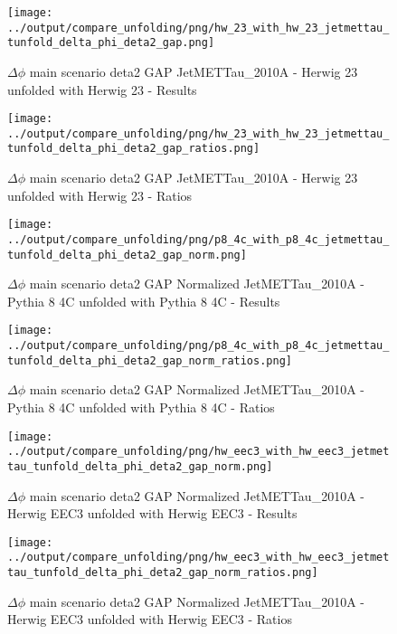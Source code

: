 \documentclass[11pt]{book}
\begin{document}
\begin{figure}[ht]
\centering
\texttt{[image: ../output/compare\_unfolding/png/hw\_23\_with\_hw\_23\_jetmettau\_tunfold\_delta\_phi\_deta2\_gap.png]}
\caption{$\Delta\phi$ main scenario deta2 GAP JetMETTau\_2010A - Herwig 23 unfolded with Herwig 23 - Results}
\label{hw_23_hw_23_jetmettau_tunfold_delta_phi_deta2_gap_a}
\end{figure}

\begin{figure}[ht]
\centering
\texttt{[image: ../output/compare\_unfolding/png/hw\_23\_with\_hw\_23\_jetmettau\_tunfold\_delta\_phi\_deta2\_gap\_ratios.png]}
\caption{$\Delta\phi$ main scenario deta2 GAP JetMETTau\_2010A - Herwig 23 unfolded with Herwig 23 - Ratios}
\label{hw_23_hw_23_jetmettau_tunfold_delta_phi_deta2_gap_b}
\end{figure}

\begin{figure}[ht]
\centering
\texttt{[image: ../output/compare\_unfolding/png/p8\_4c\_with\_p8\_4c\_jetmettau\_tunfold\_delta\_phi\_deta2\_gap\_norm.png]}
\caption{$\Delta\phi$ main scenario deta2 GAP Normalized JetMETTau\_2010A - Pythia 8 4C unfolded with Pythia 8 4C - Results}
\label{p8_p8_jetmettau_tunfold_delta_phi_deta2_gap_norm_a}
\end{figure}

\begin{figure}[ht]
\centering
\texttt{[image: ../output/compare\_unfolding/png/p8\_4c\_with\_p8\_4c\_jetmettau\_tunfold\_delta\_phi\_deta2\_gap\_norm\_ratios.png]}
\caption{$\Delta\phi$ main scenario deta2 GAP Normalized JetMETTau\_2010A - Pythia 8 4C unfolded with Pythia 8 4C - Ratios}
\label{p8_p8_jetmettau_tunfold_delta_phi_deta2_gap_norm_b}
\end{figure}

\begin{figure}[ht]
\centering
\texttt{[image: ../output/compare\_unfolding/png/hw\_eec3\_with\_hw\_eec3\_jetmettau\_tunfold\_delta\_phi\_deta2\_gap\_norm.png]}
\caption{$\Delta\phi$ main scenario deta2 GAP Normalized JetMETTau\_2010A - Herwig EEC3 unfolded with Herwig EEC3 - Results}
\label{hw_eec3_hw_eec3_jetmettau_tunfold_delta_phi_deta2_gap_norm_a}
\end{figure}

\begin{figure}[ht]
\centering
\texttt{[image: ../output/compare\_unfolding/png/hw\_eec3\_with\_hw\_eec3\_jetmettau\_tunfold\_delta\_phi\_deta2\_gap\_norm\_ratios.png]}
\caption{$\Delta\phi$ main scenario deta2 GAP Normalized JetMETTau\_2010A - Herwig EEC3 unfolded with Herwig EEC3 - Ratios}
\label{hw_eec3_hw_eec3_jetmettau_tunfold_delta_phi_deta2_gap_norm_b}
\end{figure}
\end{document}
